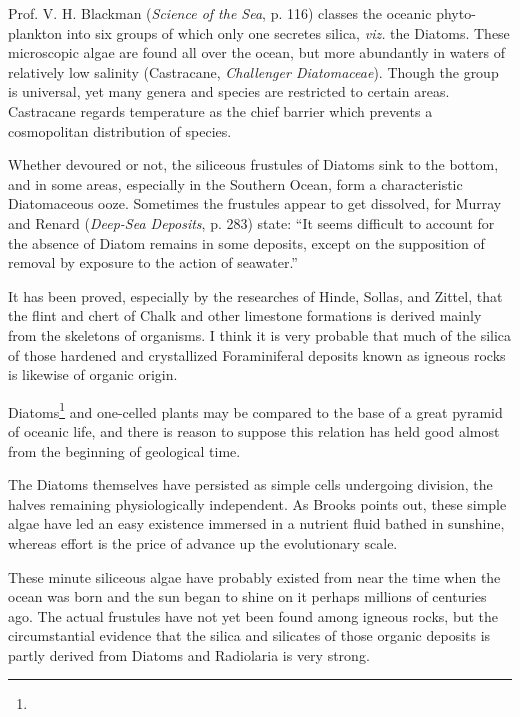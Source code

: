\documentclass[a4paper, 12pt, oneside]{article}
\begin{document}
Prof. V. H. Blackman (\emph{Science of the Sea}, p. 116) classes the oceanic phyto-plankton into six groups of which only one secretes silica, \emph{viz.} the Diatoms. These microscopic algae are found all over the ocean, but more abundantly in waters of relatively low salinity (Castracane, \emph{Challenger Diatomaceae}). Though the group is universal, yet many genera and species are restricted to certain areas. Castracane regards temperature as the chief barrier which prevents a cosmopolitan distribution of species.

Whether devoured or not, the siliceous frustules of Diatoms sink to the bottom, and in some areas, especially in the Southern Ocean, form a characteristic Diatomaceous ooze. Sometimes the frustules appear to get dissolved, for Murray and Renard (\emph{Deep-Sea Deposits}, p. 283) state: ``It seems difficult to account for the absence of Diatom remains in some deposits, except on the supposition of removal by exposure to the action of seawater.''

It has been proved, especially by the researches of Hinde, Sollas, and Zittel, that the flint and chert of Chalk and other limestone formations is derived mainly from the skeletons of organisms. I think it is very probable that much of the silica of those hardened and crystallized Foraminiferal deposits known as igneous rocks is likewise of organic origin.

Diatoms\footnote{} and one-celled plants may be compared to the base of a great pyramid of oceanic life, and there is reason to suppose this relation has held good almost from the beginning of geological time.

The Diatoms themselves have persisted as simple cells undergoing division, the halves remaining physiologically independent. As Brooks points out, these simple algae have led an easy existence immersed in a nutrient fluid bathed in sunshine, whereas effort is the price of advance up the evolutionary scale.

These minute siliceous algae have probably existed from near the time when the ocean was born and the sun began to shine on it perhaps millions of centuries ago. The actual frustules have not yet been found among igneous rocks, but the circumstantial evidence that the silica and silicates of those organic deposits is partly derived from Diatoms and Radiolaria is very strong.
\end{document}

